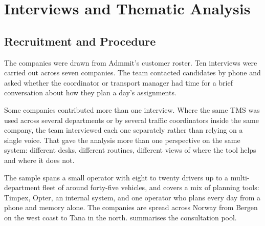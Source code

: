 \section{Interviews and Thematic Analysis}
\label{sec:interviews-thematic-analysis}

\subsection{Recruitment and Procedure}
\label{sec:interview-recruitment}
\label{sec:data-collection}

The companies were drawn from Admmit's customer roster. Ten interviews were carried out across seven companies. The team contacted candidates by phone and asked whether the coordinator or transport manager had time for a brief conversation about how they plan a day's assignments.

Some companies contributed more than one interview. Where the same TMS was used across several departments or by several traffic coordinators inside the same company, the team interviewed each one separately rather than relying on a single voice. That gave the analysis more than one perspective on the same system: different desks, different routines, different views of where the tool helps and where it does not.

The sample spans a small operator with eight to twenty drivers up to a multi-department fleet of around forty-five vehicles, and covers a mix of planning tools: Timpex, Opter, an internal system, and one operator who plans every day from a phone and memory alone. The companies are spread across Norway from Bergen on the west coast to Tana in the north.  summarises the consultation pool.

